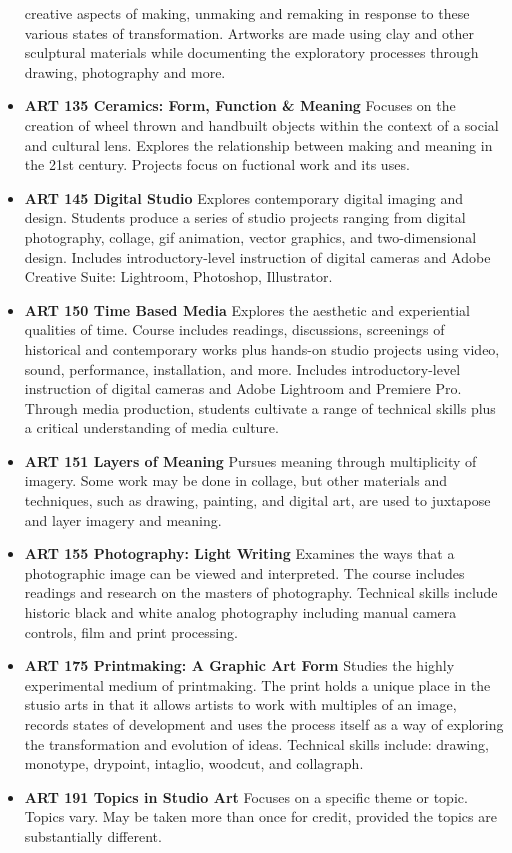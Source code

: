 \documentclass[
  letterpaper,
]{scrbook}
\begin{document}
\begin{itemize}
  creative aspects of making, unmaking and remaking in response to these
  various states of transformation. Artworks are made using clay and
  other sculptural materials while documenting the exploratory processes
  through drawing, photography and more.
\item
  \textbf{ART 135 Ceramics: Form, Function \& Meaning} Focuses on the
  creation of wheel thrown and handbuilt objects within the context of a
  social and cultural lens. Explores the relationship between making and
  meaning in the 21st century. Projects focus on fuctional work and its
  uses.
\item
  \textbf{ART 145 Digital Studio} Explores contemporary digital imaging
  and design. Students produce a series of studio projects ranging from
  digital photography, collage, gif animation, vector graphics, and
  two-dimensional design. Includes introductory-level instruction of
  digital cameras and Adobe Creative Suite: Lightroom, Photoshop,
  Illustrator.
\item
  \textbf{ART 150 Time Based Media} Explores the aesthetic and
  experiential qualities of time. Course includes readings, discussions,
  screenings of historical and contemporary works plus hands-on studio
  projects using video, sound, performance, installation, and more.
  Includes introductory-level instruction of digital cameras and Adobe
  Lightroom and Premiere Pro. Through media production, students
  cultivate a range of technical skills plus a critical understanding of
  media culture.
\item
  \textbf{ART 151 Layers of Meaning} Pursues meaning through
  multiplicity of imagery. Some work may be done in collage, but other
  materials and techniques, such as drawing, painting, and digital art,
  are used to juxtapose and layer imagery and meaning.
\item
  \textbf{ART 155 Photography: Light Writing} Examines the ways that a
  photographic image can be viewed and interpreted. The course includes
  readings and research on the masters of photography. Technical skills
  include historic black and white analog photography including manual
  camera controls, film and print processing.
\item
  \textbf{ART 175 Printmaking: A Graphic Art Form} Studies the highly
  experimental medium of printmaking. The print holds a unique place in
  the stusio arts in that it allows artists to work with multiples of an
  image, records states of development and uses the process itself as a
  way of exploring the transformation and evolution of ideas. Technical
  skills include: drawing, monotype, drypoint, intaglio, woodcut, and
  collagraph.
\item
  \textbf{ART 191 Topics in Studio Art} Focuses on a specific theme or
  topic. Topics vary. May be taken more than once for credit, provided
  the topics are substantially different.
\end{itemize}
\end{document}

